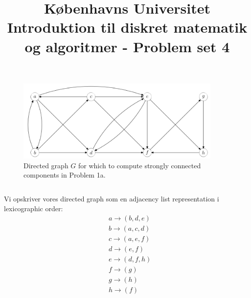 \documentclass[a4paper,12pt]{article}
\begin{document}
% 

\title{Københavns Universitet\\
Introduktion til diskret matematik og algoritmer - Problem set 4}
\maketitle %



\section[Question 1]{}
\begin{figure}[H]
    \centering
    \includegraphics[width=0.9\textwidth]{1.png}
    \caption{Directed graph $G$ for which to compute strongly connected components in Problem 1a.}
\end{figure}

\subsection[]{}
Vi opskriver vores directed graph som en adjacency list representation i lexicographic order:
\[
\begin{aligned}
&a \rightarrow (b, d, e)\\
&b \rightarrow (a, c, d)\\
&c \rightarrow (a, e, f)\\
&d \rightarrow (e, f)\\
&e \rightarrow (d, f, h)\\
&f \rightarrow (g)\\
&g \rightarrow (h)\\
&h \rightarrow (f)\\
\end{aligned}
\]
\end{document}

